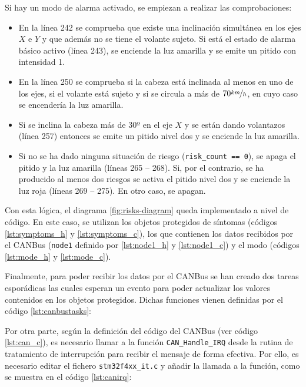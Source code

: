 Si hay un modo de alarma activado, se empiezan a realizar las comprobaciones:
\begin{itemize}
  \item En la línea 242 se comprueba que existe una inclinación simultánea en los ejes $X$
        e $Y$ y que además no se tiene el volante sujeto. Si está el estado de alarma
        básico activo (línea 243), se enciende la luz amarilla y se emite un pitido con
        intensidad 1.
  \item En la línea 250 se comprueba si la cabeza está inclinada al menos en uno de los ejes,
        si el volante está sujeto y si se circula a más de $70 \nicefrac{km}{h}$, en cuyo
        caso se encendería la luz amarilla.
  \item Si se inclina la cabeza más de 30º en el eje $X$ y se están dando volantazos (línea
        257) entonces se emite un pitido nivel dos y se enciende la luz amarilla.
  \item Si no se ha dado ninguna situación de riesgo (\texttt{risk\_count == 0}), se
        apaga el pitido y la luz amarilla (líneas 265 -- 268). Si, por el contrario, se
        ha producido al menos dos riesgos se activa el pitido nivel dos y se enciende
        la luz roja (líneas 269 -- 275). En otro caso, se apagan.
\end{itemize}

Con esta lógica, el diagrama \ref{fig:risks-diagram} queda implementado a nivel de código.
En este caso, se utilizan los objetos protegidos de síntomas (códigos \ref{lst:symptoms_h}
y \ref{lst:symptoms_c}), los que contienen los datos recibidos por el CANBus (\texttt{node1}
definido por \ref{lst:node1_h} y \ref{lst:node1_c}) y el modo (códigos \ref{lst:mode_h} y
\ref{lst:mode_c}).

Finalmente, para poder recibir los datos por el CANBus se han creado dos tareas esporádicas
las cuales esperan un evento para poder actualizar los valores contenidos en los objetos
protegidos. Dichas funciones vienen definidas por el código \ref{lst:canbustasks}:



Por otra parte, según la definición del código del CANBus (ver código \ref{lst:can_c}),
es necesario llamar a la función \texttt{CAN\_Handle\_IRQ} desde la rutina de 
tratamiento de interrupción para recibir el mensaje de forma efectiva. Por ello, es
necesario editar el fichero \texttt{stm32f4xx\_it.c} y añadir la llamada a la
función, como se muestra en el código \ref{lst:canirq}:


